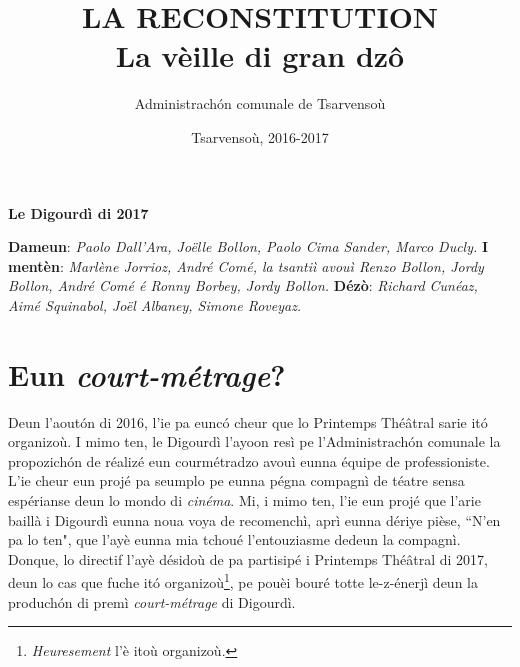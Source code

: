 \title{LA RECONSTITUTION\\ La vèille di gran dz\^{o}}
\author{Administrach\'on comunale de Tsarvensoù}
\date{Tsarvensoù, 2016-2017}

\maketitle

\markboth{\MakeUppercase{\thetitle}}{\MakeUppercase{\thetitle}}

\cleardoublepage 
\vspace*{\fill}
\begin{center}
\textbf{\LARGE Le Digourdì di 2017}
\end{center}

\begin{figure}[h]
\centering
{}
\end{figure}
\noindent
\textbf{Dameun}: \textit{Paolo Dall'Ara, Jo\"{e}lle Bollon, Paolo Cima Sander, Marco Ducly.}
\newline
\newline
\textbf{I mentèn}: \textit{Marlène Jorrioz, André Comé, la tsantiì avouì Renzo Bollon, Jordy Bollon,  André Comé é Ronny Borbey, Jordy Bollon.}
\newline
\newline
\textbf{Dézò}: \textit{Richard Cunéaz, Aimé Squinabol, Jo\"{e}l Albaney, Simone Roveyaz.}


\section*{Eun \textit{court-métrage}?}
Deun l'aout\'on di 2016, l'ie pa eunc\'o cheur que lo Printemps Thé\^atral sarie it\'o organizoù. I mimo ten, le Digourdì l'ayoon resì pe l'Administrach\'on comunale la propozich\'on de réalizé eun courmétradzo avouì eunna équipe de professioniste. L'ie cheur eun projé pa seumplo pe eunna pégna compagnì de téatre sensa espérianse deun lo mondo di \textit{cinéma}. Mi, i mimo ten, l'ie eun projé que l'arie baillà i Digourdì eunna noua voya de recomenchì, aprì eunna dériye pièse, ``N'en pa lo ten", que l'ayè eunna mia tchoué l'entouziasme dedeun la compagnì. 
\\Donque, lo directif l'ayè désidoù de pa partisipé i Printemps Thé\^atral di 2017, deun lo cas que fuche it\'o organizoù\footnote{ \textit{Heuresement} l'è itoù organizoù.}, pe pouèi bouré totte le-z-énerjì deun la produch\'on di premì \textit{court-métrage} di Digourdì.

